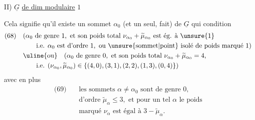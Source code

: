 II) $\underline G$ \uline{de dim modulaire} $1$

Cela signifie qu'il existe un sommet $\alpha_0$ (et un seul,  fait) de $\underline G$ qui   condition
\[
\begin{aligned}
\text{(68)}\quad &(\alpha_0\text{ de genre }1,\text{ et son poids total }\nu_{\alpha_0}+\widetilde\mu_{\alpha_0}\text{ est ég. à }\unsure{1}\\
&\qquad\text{i.e. }\alpha_0\text{ est d'ordre }1,\text{ ou \unsure{sommet|point} isolé de poids marqué }1)\\
&\uline{\text{ou}}\quad(\alpha_0\text{ de genre }0,\text{ et son poids total }\nu_{\alpha_0}+\widetilde\mu_{\alpha_0}=4,\\
&\qquad\text{i.e. }(\nu_{\alpha_0},\widetilde\mu_{\alpha_0})\in\{(4,0),(3,1),(2,2),(1,3),(0,4)\})
\end{aligned}
\]
avec en plus
\[
\begin{aligned}
\text{(69)}\quad&\text{les sommets }\alpha\ne\alpha_0\text{ sont de genre }0,\\
&\text{d'ordre }\widetilde\mu_\alpha\leq3,\text{ et pour un tel }\alpha\text{ le poids}\\
&\text{marqué }\nu_\alpha\text{ est égal à }3-\widetilde\mu_\alpha.
\end{aligned}
\]


